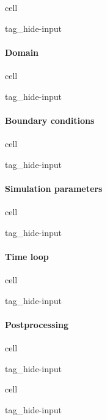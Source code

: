 \documentclass[letterpaper,10pt,english]{jupyterBook}
\begin{document}
\begin{sphinxuseclass}{cell}
\begin{sphinxuseclass}{tag_hide-input}
\end{sphinxuseclass}
\end{sphinxuseclass}

\paragraph{Domain}
\label{\detokenize{ch/pde/psys-1d:domain}}
\begin{sphinxuseclass}{cell}
\begin{sphinxuseclass}{tag_hide-input}
\end{sphinxuseclass}
\end{sphinxuseclass}

\paragraph{Boundary conditions}
\label{\detokenize{ch/pde/psys-1d:boundary-conditions}}
\begin{sphinxuseclass}{cell}
\begin{sphinxuseclass}{tag_hide-input}
\end{sphinxuseclass}
\end{sphinxuseclass}

\paragraph{Simulation parameters}
\label{\detokenize{ch/pde/psys-1d:simulation-parameters}}
\begin{sphinxuseclass}{cell}
\begin{sphinxuseclass}{tag_hide-input}
\end{sphinxuseclass}
\end{sphinxuseclass}

\paragraph{Time loop}
\label{\detokenize{ch/pde/psys-1d:time-loop}}
\begin{sphinxuseclass}{cell}
\begin{sphinxuseclass}{tag_hide-input}
\end{sphinxuseclass}
\end{sphinxuseclass}

\paragraph{Post\sphinxhyphen{}processing}
\label{\detokenize{ch/pde/psys-1d:post-processing}}
\begin{sphinxuseclass}{cell}
\begin{sphinxuseclass}{tag_hide-input}
\end{sphinxuseclass}
\end{sphinxuseclass}
\begin{sphinxuseclass}{cell}
\begin{sphinxuseclass}{tag_hide-input}
\end{sphinxuseclass}
\end{sphinxuseclass}
\sphinxstepscope
\end{document}
